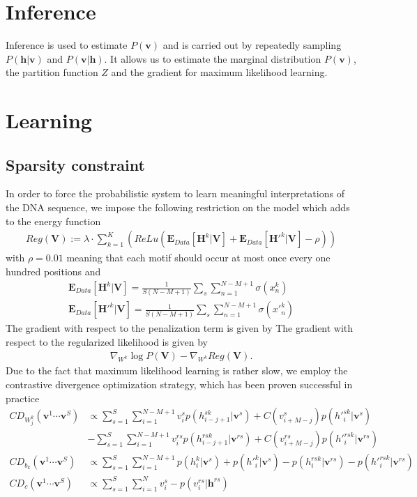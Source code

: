 \documentclass[12pt]{article}
\begin{document}
\section{Inference}
Inference is used to estimate $P(\mathbf{v})$ and is carried out by repeatedly sampling
$P(\mathbf{h}|\mathbf{v})$ and $P(\mathbf{v}|\mathbf{h})$. It allows us to estimate the
marginal distribution $P(\mathbf{v})$, the partition function $Z$ and the gradient for 
maximum likelihood learning.
\section{Learning}
\subsection{Sparsity constraint}
In order to force the probabilistic system to learn meaningful interpretations
of the DNA sequence, we impose the following restriction on the model which adds to
the energy function
\begin{align}
Reg(\mathbf{V}):=\lambda\cdot \sum_{k=1}^K (ReLu(\mathbf{E}_{Data}[\mathbf{H}^k|\mathbf{V}] + \mathbf{E}_{Data}[\mathbf{H'}^k|\mathbf{V}] - \rho))
\end{align}
with $\rho=0.01$ meaning that each motif should occur at most once every one hundred positions
and 
\begin{align}
\mathbf{E}_{Data}[\mathbf{H}^k|\mathbf{V}]=\frac{1}{S(N-M+1)}\sum_s\sum_{n=1}^{N-M+1}\sigma(x_n^k) \\
\mathbf{E}_{Data}[{\mathbf{H}'}^k|\mathbf{V}]=\frac{1}{S(N-M+1)}\sum_s\sum_{n=1}^{N-M+1} \sigma({x'}_n^k)
\end{align}
The gradient with respect to the penalization term is given by 
The gradient with respect to the regularized likelihood is given by
\begin{align}
	\nabla_{W^k} \log P(\mathbf{V}) - \nabla_{W^k}Reg(\mathbf{V}).
\end{align}
Due to the fact that maximum likelihood learning is rather slow, we
employ the contrastive divergence optimization strategy, which has been proven
successful in practice
\begin{align}
	CD_{W_j^k}(\mathbf{v}^1\cdots\mathbf{v}^S) &\propto 
	\sum_{s=1}^S \sum_{i=1}^{N-M+1} v_{i}^s p(h_{i-j+1}^{sk}|\mathbf{v}^s)+
	 C(v_{i+M-j}^s) p({h'}_{i}^{sk}|\mathbf{v}^s)\nonumber\\
	 &- \sum_{s=1}^S \sum_{i=1}^{N-M+1}v_{i}^{rs} p(h_{i-j+1}^{rsk}|\mathbf{v}^{rs})
	 +C(v_{i+M-j}^{rs}) p({h'}_{i}^{rsk}|\mathbf{v}^{rs})\label{cd1w}\\
	CD_{b_k}(\mathbf{v}^1\cdots\mathbf{v}^S) &\propto 
	\sum_{s=1}^S \sum_{i=1}^{N-M+1} p(h_{i}^{k}|\mathbf{v}^s)+
	p({h'}_{i}^{k}|\mathbf{v}^s)
	- p(h_{i}^{rsk}|\mathbf{v}^{rs})
	- p({h'}_{i}^{rsk}|\mathbf{v}^{rs})\label{cd1b}\\
	CD_{c}(\mathbf{v}^1\cdots\mathbf{v}^S) &\propto 
	\sum_{s=1}^S \sum_{i=1}^{N} v_{i}^s 
	- p(v_{i}^{rs}|\mathbf{h}^{rs})
\end{align}
\end{document}

